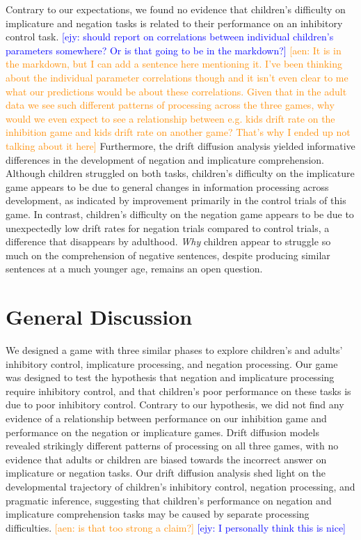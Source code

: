 \documentclass[10pt,letterpaper]{article}
\newcommand{\ejy}[1]{\textcolor{Blue}{[ejy: #1]}}
\newcommand{\aen}[1]{\textcolor{DarkOrange}{[aen: #1]}}
\begin{document}
Contrary to our expectations, we found no evidence that children's difficulty on implicature and negation tasks is related to their performance on an inhibitory control task. \ejy{should report on correlations between individual children's parameters somewhere? Or is that going to be in the markdown?} \aen{It is in the markdown, but I can add a sentence here mentioning it.  I've been thinking about the individual parameter correlations though and it isn't even clear to me what our predictions would be about these correlations.  Given that in the adult data we see such different patterns of processing across the three games, why would we even expect to see a relationship between e.g. kids drift rate on the inhibition game and kids drift rate on another game? That's why I ended up not talking about it here}  Furthermore, the drift diffusion analysis yielded informative differences in the development of negation and implicature comprehension.  Although children struggled on both tasks, children's difficulty on the implicature game appears to be due to general changes in information processing across development, as indicated by improvement primarily in the control trials of this game.  In contrast, children's difficulty on the negation game appears to be due to unexpectedly low drift rates for negation trials compared to control trials, a difference that disappears by adulthood.  \emph{Why} children appear to struggle so much on the comprehension of negative sentences, despite producing similar sentences at a much younger age, remains an open question.  


\section{General Discussion}

We designed a game with three similar phases to explore children's and adults' inhibitory control, implicature processing, and negation processing.  Our game was designed to test the hypothesis that negation and implicature processing require inhibitory control, and that children's poor performance on these tasks is due to poor inhibitory control.  Contrary to our hypothesis, we did not find any evidence of a relationship between performance on our inhibition game and performance on the negation or implicature games.  Drift diffusion models revealed strikingly different patterns of processing on all three games, with no evidence that adults or children are biased towards the incorrect answer on implicature or negation tasks.  Our drift diffusion analysis shed light on the developmental trajectory of children's inhibitory control, negation processing, and pragmatic inference, suggesting that children's performance on negation and implicature comprehension tasks may be caused by separate processing difficulties. \aen{is that too strong a claim?} \ejy{I personally think this is nice}
\end{document}
